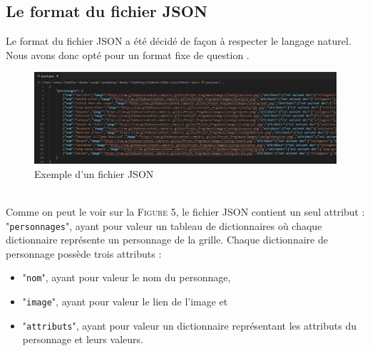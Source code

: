 \documentclass{article}
\begin{document}
  		\subsection{Le format du fichier JSON}
            Le format du fichier JSON a été décidé de façon à respecter le langage naturel. Nous avons donc opté pour un format fixe de question .\\
            \begin{figure}[h]
                \centering
                \includegraphics[width=15.5cm]{images/formatjson.png}
                \caption{Exemple d'un fichier JSON}
            \end{figure}\\
            Comme on peut le voir sur la \textsc{Figure 5}, le fichier JSON contient un seul attribut : "\texttt{personnages}", ayant pour valeur un tableau de dictionnaires où chaque dictionnaire représente un personnage de la grille.
            Chaque dictionnaire de personnage possède trois attributs :
            \begin{itemize}
                \item "\texttt{nom}", ayant pour valeur le nom du personnage,
                \item "\texttt{image}", ayant pour valeur le lien de l'image et
                \item "\texttt{attributs}", ayant pour valeur un dictionnaire représentant les attributs du personnage et leurs valeurs.
            \end{itemize}
  		
\end{document}
